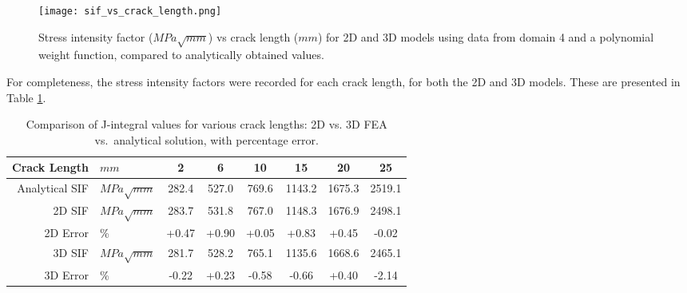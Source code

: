 \begin{figure}[H]
	\centering
	\texttt{[image: sif\_vs\_crack\_length.png]}
	\caption{Stress intensity factor ($MPa \sqrt{mm}$) vs crack length ($mm$) for 2D and 3D models using data from domain 4 and a polynomial weight function, compared to analytically obtained values.}
	\label{fig:sif_vs_crack_length}
\end{figure}

\newpage
For completeness, the stress intensity factors were recorded for each crack length, for both the 2D and 3D models. These are presented in Table \ref{tab:j_integral_comparison}.

\begin{table}[H]
	\caption{Comparison of J-integral values for various crack lengths: 2D vs. 3D FEA vs.\ analytical solution, with percentage error.}
	\centering
	\begin{tabular}{|r l|c|c|c|c|c|c|}
		\hline
		Crack Length & $mm$ & 2 & 6 & 10 & 15 & 20 & 25 \\ \hline
		Analytical SIF & $MPa \sqrt{mm}$ & 282.4  & 527.0  & 769.6  & 1143.2 & 1675.3 & 2519.1 \\
		2D SIF & $MPa \sqrt{mm}$ & 283.7  & 531.8  & 767.0  & 1148.3 & 1676.9 & 2498.1 \\
		2D Error & \% & +0.47 & +0.90 & +0.05 & +0.83 & +0.45 & -0.02 \\
		3D SIF & $MPa \sqrt{mm}$   & 281.7  & 528.2  & 765.1  & 1135.6 & 1668.6 & 2465.1 \\
		3D Error & \% & -0.22 & +0.23 & -0.58 & -0.66 & +0.40 & -2.14 \\ \hline
	\end{tabular}
	\label{tab:j_integral_comparison}
\end{table}


